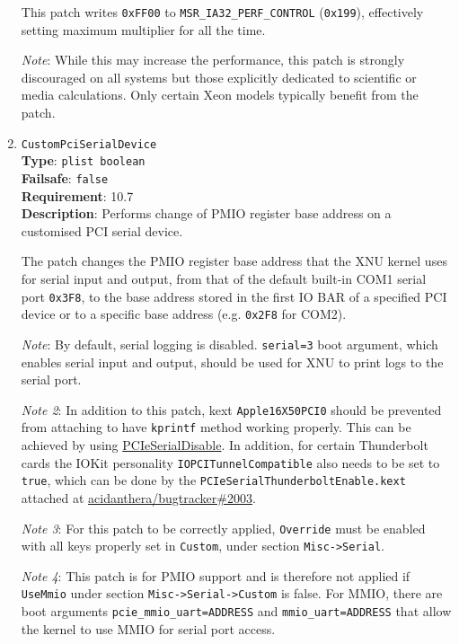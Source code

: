 \documentclass[]{article}
\begin{document}
\begin{enumerate}
  This patch writes \texttt{0xFF00} to \texttt{MSR\_IA32\_PERF\_CONTROL} (\texttt{0x199}),
  effectively setting maximum multiplier for all the time.

  \emph{Note}: While this may increase the performance, this patch is strongly discouraged
  on all systems but those explicitly dedicated to scientific or media calculations.
  Only certain Xeon models typically benefit from the patch.

\item
  \texttt{CustomPciSerialDevice}\\
  \textbf{Type}: \texttt{plist\ boolean}\\
  \textbf{Failsafe}: \texttt{false}\\
  \textbf{Requirement}: 10.7\\
  \textbf{Description}: Performs change of PMIO register base address
  on a customised PCI serial device.

  The patch changes the PMIO register base address that the XNU kernel uses for serial input and output,
  from that of the default built-in COM1 serial port \texttt{0x3F8}, to the base address stored in the first
  IO BAR of a specified PCI device or to a specific base address (e.g. \texttt{0x2F8} for COM2).

  \emph{Note}: By default, serial logging is disabled. \texttt{serial=3} boot argument, which enables serial input and output,
  should be used for XNU to print logs to the serial port.

  \emph{Note 2}: In addition to this patch, kext \texttt{Apple16X50PCI0} should be prevented from attaching
  to have \texttt{kprintf} method working properly. This can be achieved by using \href{https://github.com/joevt/PCIeSerialDisable}{PCIeSerialDisable}.
  In addition, for certain Thunderbolt cards the IOKit personality \texttt{IOPCITunnelCompatible} also needs to be set to \texttt{true},
  which can be done by the \texttt{PCIeSerialThunderboltEnable.kext} attached at \href{https://github.com/acidanthera/bugtracker/issues/2003#issuecomment-1116761087}{acidanthera/bugtracker\#2003}.


  \emph{Note 3}: For this patch to be correctly applied, \texttt{Override}
  must be enabled with all keys properly set in \texttt{Custom}, under section \texttt{Misc->Serial}.

  \emph{Note 4}: This patch is for PMIO support and is therefore not applied if \texttt{UseMmio} under section \texttt{Misc->Serial->Custom} is false.
  For MMIO, there are boot arguments \texttt{pcie\_mmio\_uart=ADDRESS} and \texttt{mmio\_uart=ADDRESS} that allow the kernel to use MMIO for serial port access.


\end{enumerate}
\end{document}
